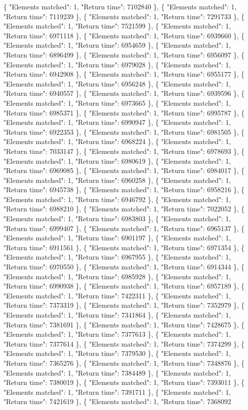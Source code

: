  \{ "Elements matched": 1, "Return time": 7102840 \}, \{ "Elements matched": 1, "Return time": 7119239 \}, \{ "Elements matched": 1, "Return time": 7291733 \}, \{ "Elements matched": 1, "Return time": 7521599 \}, \{ "Elements matched": 1, "Return time": 6971118 \}, \{ "Elements matched": 1, "Return time": 6939660 \}, \{ "Elements matched": 1, "Return time": 6954659 \}, \{ "Elements matched": 1, "Return time": 6896499 \}, \{ "Elements matched": 1, "Return time": 6956097 \}, \{ "Elements matched": 1, "Return time": 6979028 \}, \{ "Elements matched": 1, "Return time": 6942908 \}, \{ "Elements matched": 1, "Return time": 6955177 \}, \{ "Elements matched": 1, "Return time": 6956248 \}, \{ "Elements matched": 1, "Return time": 6940557 \}, \{ "Elements matched": 1, "Return time": 6939596 \}, \{ "Elements matched": 1, "Return time": 6973665 \}, \{ "Elements matched": 1, "Return time": 6985371 \}, \{ "Elements matched": 1, "Return time": 6995787 \}, \{ "Elements matched": 1, "Return time": 6990947 \}, \{ "Elements matched": 1, "Return time": 6922353 \}, \{ "Elements matched": 1, "Return time": 6981505 \}, \{ "Elements matched": 1, "Return time": 6968224 \}, \{ "Elements matched": 1, "Return time": 7033147 \}, \{ "Elements matched": 1, "Return time": 6978693 \}, \{ "Elements matched": 1, "Return time": 6980619 \}, \{ "Elements matched": 1, "Return time": 6969085 \}, \{ "Elements matched": 1, "Return time": 6984017 \}, \{ "Elements matched": 1, "Return time": 6960258 \}, \{ "Elements matched": 1, "Return time": 6945738 \}, \{ "Elements matched": 1, "Return time": 6958216 \}, \{ "Elements matched": 1, "Return time": 6946792 \}, \{ "Elements matched": 1, "Return time": 6988210 \}, \{ "Elements matched": 1, "Return time": 7022052 \}, \{ "Elements matched": 1, "Return time": 6983803 \}, \{ "Elements matched": 1, "Return time": 6999407 \}, \{ "Elements matched": 1, "Return time": 6965137 \}, \{ "Elements matched": 1, "Return time": 6901197 \}, \{ "Elements matched": 1, "Return time": 6911561 \}, \{ "Elements matched": 1, "Return time": 6971354 \}, \{ "Elements matched": 1, "Return time": 6967955 \}, \{ "Elements matched": 1, "Return time": 6970550 \}, \{ "Elements matched": 1, "Return time": 6914344 \}, \{ "Elements matched": 1, "Return time": 6985928 \}, \{ "Elements matched": 1, "Return time": 6990938 \}, \{ "Elements matched": 1, "Return time": 6957189 \}, \{ "Elements matched": 1, "Return time": 7422311 \}, \{ "Elements matched": 1, "Return time": 7373319 \}, \{ "Elements matched": 1, "Return time": 7352979 \}, \{ "Elements matched": 1, "Return time": 7341864 \}, \{ "Elements matched": 1, "Return time": 7381691 \}, \{ "Elements matched": 1, "Return time": 7428675 \}, \{ "Elements matched": 1, "Return time": 7377613 \}, \{ "Elements matched": 1, "Return time": 7377614 \}, \{ "Elements matched": 1, "Return time": 7374299 \}, \{ "Elements matched": 1, "Return time": 7379530 \}, \{ "Elements matched": 1, "Return time": 7365276 \}, \{ "Elements matched": 1, "Return time": 7348876 \}, \{ "Elements matched": 1, "Return time": 7384489 \}, \{ "Elements matched": 1, "Return time": 7380019 \}, \{ "Elements matched": 1, "Return time": 7393011 \}, \{ "Elements matched": 1, "Return time": 7391711 \}, \{ "Elements matched": 1, "Return time": 7421619 \}, \{ "Elements matched": 1, "Return time": 7368092 